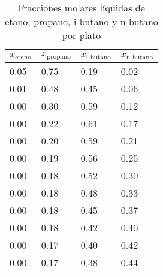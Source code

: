 \newpage
\begin{table}[ht]
    \centering\small
    \caption{Fracciones molares líquidas de etano, propano, i-butano y n-butano por plato}
    \begin{tabular}{|p{2.5cm}|p{2.5cm}|p{2.5cm}|p{2.5cm}|}
        \hline
        \textbf{$x_{\text{etano}}$} & \textbf{$x_{\text{propano}}$} & \textbf{$x_{\text{i-butano}}$} & \textbf{$x_{\text{n-butano}}$} \\ \hline
        0.05                        & 0.75                          & 0.19                           & 0.02                           \\ \hline
        0.01                        & 0.48                          & 0.45                           & 0.06                           \\ \hline
        0.00                        & 0.30                          & 0.59                           & 0.12                           \\ \hline
        0.00                        & 0.22                          & 0.61                           & 0.17                           \\ \hline
        0.00                        & 0.20                          & 0.59                           & 0.21                           \\ \hline
        0.00                        & 0.19                          & 0.56                           & 0.25                           \\ \hline
        0.00                        & 0.18                          & 0.52                           & 0.30                           \\ \hline
        0.00                        & 0.18                          & 0.48                           & 0.33                           \\ \hline
        0.00                        & 0.18                          & 0.45                           & 0.37                           \\ \hline
        0.00                        & 0.18                          & 0.42                           & 0.40                           \\ \hline
        0.00                        & 0.17                          & 0.40                           & 0.42                           \\ \hline
        0.00                        & 0.17                          & 0.38                           & 0.44                           \\ \hline

\end{tabular}
\end{table}
